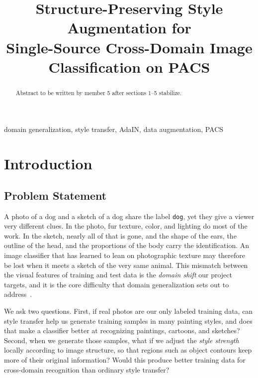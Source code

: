 \documentclass[conference]{IEEEtran}
\begin{document}
\title{Structure-Preserving Style Augmentation for\\
Single-Source Cross-Domain Image Classification on PACS}

\author{
\and
{}
\and
{}
\and
{}
\and
{}
}

\maketitle

\begin{abstract}
Abstract to be written by member 5 after sections 1--5 stabilize.
\end{abstract}

\begin{IEEEkeywords}
domain generalization, style transfer, AdaIN, data augmentation, PACS
\end{IEEEkeywords}

\section{Introduction}

\subsection{Problem Statement}

A photo of a dog and a sketch of a dog share the label \texttt{dog}, yet they give a viewer very different clues. In the photo, fur texture, color, and lighting do most of the work. In the sketch, nearly all of that is gone, and the shape of the ears, the outline of the head, and the proportions of the body carry the identification. An image classifier that has learned to lean on photographic texture may therefore be lost when it meets a sketch of the very same animal. This mismatch between the visual features of training and test data is the \textit{domain shift} our project targets, and it is the core difficulty that domain generalization sets out to address~\cite{zhou2023dgsurvey}.

We ask two questions. First, if real photos are our only labeled training data, can style transfer help us generate training samples in many painting styles, and does that make a classifier better at recognizing paintings, cartoons, and sketches? Second, when we generate those samples, what if we adjust the \textit{style strength} locally according to image structure, so that regions such as object contours keep more of their original information? Would this produce better training data for cross-domain recognition than ordinary style transfer?
\end{document}
